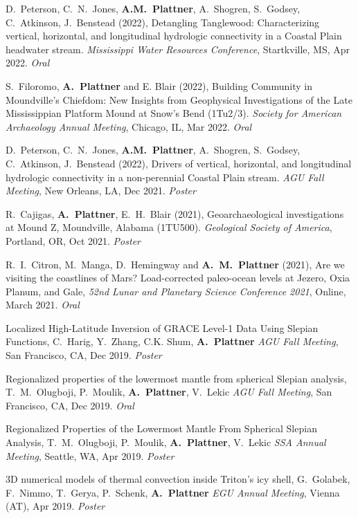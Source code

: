 \documentclass[10pt]{article}
\begin{document}
\spcp D.~Peterson, C.~N.~Jones, \textbf{A.M.~Plattner}, A.~Shogren,
S.~Godsey, C.~Atkinson, J.~Benstead (2022), Detangling Tanglewood:
Characterizing vertical, horizontal, and longitudinal hydrologic
connectivity in a Coastal Plain headwater stream. \emph{Mississippi
Water Resources Conference}, Startkville, MS, Apr 2022.  \emph{Oral}

\spcp S.~Filoromo, \textbf{A.~Plattner} and E. Blair (2022), Building
Community in Moundville's Chiefdom: New Insights from Geophysical
Investigations of the Late Mississippian Platform Mound at Snow's Bend
(1Tu2/3). \emph{Society for American Archaeology Annual Meeting}, Chicago,
IL, Mar 2022. \emph{Oral}

\spcp D.~Peterson, C.~N.~Jones, \textbf{A.M.~Plattner}, A.~Shogren,
S.~Godsey, C.~Atkinson, J.~Benstead (2022), Drivers of vertical,
horizontal, and longitudinal hydrologic connectivity in a
non-perennial Coastal Plain stream. \emph{AGU Fall Meeting}, New
Orleans, LA, Dec 2021. \emph{Poster}

\spcp R.~Cajigas, \textbf{A.~Plattner}, E.~H.~Blair (2021),
Geoarchaeological investigations at Mound Z, Moundville, Alabama
(1TU500). \emph{Geological Society of America}, Portland, OR, Oct
2021. \emph{Poster}

\spcp R.~I.~Citron, M.~Manga, D.~Hemingway and \textbf{A.~M.~Plattner}
(2021), Are we visiting the coastlines of Mars? Load-corrected
paleo-ocean levels at Jezero, Oxia Planum, and Gale, \emph{52nd Lunar
and Planetary Science Conference 2021}, Online, March 2021.
\emph{Oral}

\spcp
Localized High-Latitude Inversion of GRACE Level-1 Data Using Slepian Functions,
C.~Harig, Y.~Zhang, C.K. Shum, \textbf{A.~Plattner}
\emph{AGU Fall Meeting}, San Francisco, CA, Dec 2019. \emph{Poster}

\spcp
Regionalized properties of the lowermost mantle from spherical Slepian analysis,
T.~M.~Olugboji, P.~Moulik, \textbf{A.~Plattner}, V.~Lekic
\emph{AGU Fall Meeting}, San Francisco, CA, Dec 2019. \emph{Oral}

\spcp Regionalized Properties of the Lowermost Mantle From Spherical
Slepian Analysis, T.~M.~Olugboji, P.~Moulik, \textbf{A.~Plattner},
V.~Lekic \emph{SSA Annual Meeting}, Seattle, WA, Apr
2019. \emph{Poster}

\spcp 3D numerical models of thermal convection inside Triton’s icy
shell, G.~Golabek, F.~Nimmo, T.~Gerya, P.~Schenk, \textbf{A.~Plattner}
\emph{EGU Annual Meeting}, Vienna (AT), Apr 2019. \emph{Poster}
\end{document}

